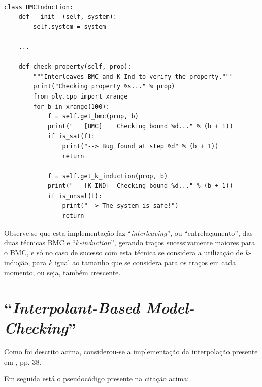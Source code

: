 \documentclass[11pt,a4paper]{report}%
\newenvironment{code}{\captionsetup{type=listing}}{}
\def\imc{``\textit{Interpolant-Based Model-Checking}''\xspace}
\def\kind{``\textit{$k$-induction}''\xspace}
\begin{document}

\begin{code}
\begin{verbatim}

class BMCInduction:
    def __init__(self, system):
        self.system = system

    ...

    def check_property(self, prop):
        """Interleaves BMC and K-Ind to verify the property."""
        print("Checking property %s..." % prop)
        from ply.cpp import xrange
        for b in xrange(100):
            f = self.get_bmc(prop, b)
            print("   [BMC]    Checking bound %d..." % (b + 1))
            if is_sat(f):
                print("--> Bug found at step %d" % (b + 1))
                return

            f = self.get_k_induction(prop, b)
            print("   [K-IND]  Checking bound %d..." % (b + 1))
            if is_unsat(f):
                print("--> The system is safe!")
                return

\end{verbatim}
\end{code}

Observe-se que esta implementação faz ``\textit{interleaving}'', ou ``entrelaçamento'',
das duas técnicas BMC e \kind, gerando traços sucessivamente maiores para o BMC, e só
no caso de sucesso com esta técnica se considera a utilização de $k$-indução, para
$k$ igual ao tamanho que se considera para os traços em cada momento, ou seja,
também crescente.

\section{\imc}
\label{analysis:imc}

Como foi descrito acima, considerou-se a implementação da interpolação presente em
\cite{interpolation_thesis}, pp. 38.

Em seguida está o pseudocódigo presente na citação acima:
\end{document}
